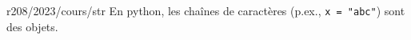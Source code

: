 \begin{question}{r208/2023/cours/str}
  En python, les chaînes de caractères (p.ex., \lstinline{x = "abc"})
  sont des objets.
  \begin{reponses}
  \end{reponses}
\end{question}
